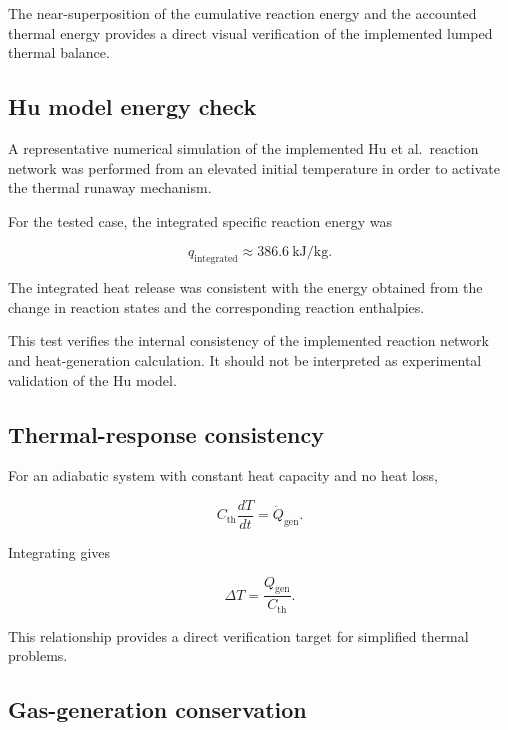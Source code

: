 The near-superposition of the cumulative reaction energy and the
accounted thermal energy provides a direct visual verification of the
implemented lumped thermal balance.

\subsection{Hu model energy check}

A representative numerical simulation of the implemented Hu et al.\
reaction network was performed from an elevated initial temperature in
order to activate the thermal runaway mechanism.

For the tested case, the integrated specific reaction energy was

\begin{equation}
    q_{\mathrm{integrated}}
    \approx
    \SI{386.6}{\kilo\joule\per\kilogram}.
\end{equation}

The integrated heat release was consistent with the energy obtained from
the change in reaction states and the corresponding reaction
enthalpies.

This test verifies the internal consistency of the implemented reaction
network and heat-generation calculation. It should not be interpreted as
experimental validation of the Hu model.


\subsection{Thermal-response consistency}

For an adiabatic system with constant heat capacity and no heat loss,

\begin{equation}
    C_{\mathrm{th}}
    \frac{dT}{dt}
    =
    \dot{Q}_{\mathrm{gen}}.
\end{equation}

Integrating gives

\begin{equation}
    \Delta T
    =
    \frac{
        Q_{\mathrm{gen}}
    }{
        C_{\mathrm{th}}
    }.
    \label{eq:verification_adiabatic_temperature}
\end{equation}

This relationship provides a direct verification target for simplified
thermal problems.


\subsection{Gas-generation conservation}

